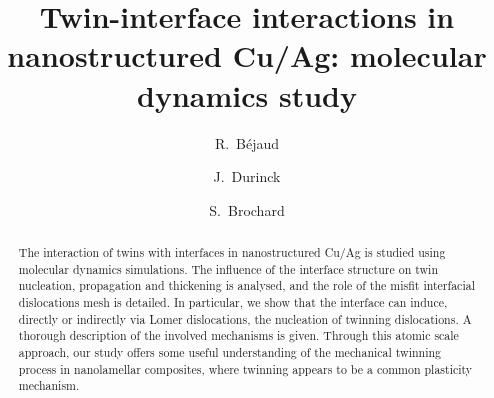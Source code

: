\documentclass[final,3p,times,twocolumn]{elsarticle}
\begin{document}
\begin{frontmatter}



\title{Twin-interface interactions in nanostructured Cu/Ag: molecular dynamics study}


\author[pprime]{R.~Béjaud}
\author[pprime]{J.~Durinck}
\author[pprime]{S.~Brochard}



\address[pprime]{Institut Pprime, CNRS - Université de Poitiers - ENSMA, UPR 3346, Département de Physique et Mécanique des Matériaux, Bvd M. et P. Curie, SP2MI, BP 30179, 86962 Futuroscope Chasseneuil Cedex, France}


\begin{abstract}
The interaction of twins with interfaces in nanostructured Cu/Ag is studied using molecular dynamics simulations. The influence of the interface structure on twin nucleation, propagation and thickening is analysed, and the role of the misfit interfacial dislocations mesh is detailed. In particular, we show that the interface can induce, directly or indirectly via Lomer dislocations, the nucleation of twinning dislocations. A thorough description of the involved mechanisms is given. Through this atomic scale approach, our study offers some useful understanding of the mechanical twinning process in nanolamellar composites, where twinning appears to be a common plasticity mechanism.


\end{abstract}
\end{frontmatter}
\end{document}
